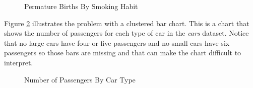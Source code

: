 \begin{figure}[H]
  \begin{center}
    \caption{Permature Births By Smoking Habit}
    \label{vfr:img05}
  \end{center}
\end{figure}

Figure \ref{vfr:img06} illustrates the problem with a clustered bar chart. This is a chart that shows the number of passengers for each type of car in the \textit{cars} dataset. Notice that no large cars have four or five passengers and no small cars have  six passengers so those bars are missing and that can make the chart difficult to interpret.

\begin{figure}[H]
  \begin{center}
    \caption{Number of Passengers By Car Type}
    \label{vfr:img06}
  \end{center}
\end{figure}

